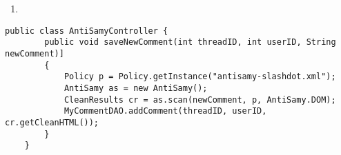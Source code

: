 \begin{enumerate}
\def\labelenumi{(\arabic{enumi})}
\setcounter{enumi}{5}
\tightlist
\item
\end{enumerate}

\begin{verbatim}
public class AntiSamyController {  
        public void saveNewComment(int threadID, int userID, String newComment)]
        {  
            Policy p = Policy.getInstance("antisamy-slashdot.xml");  
            AntiSamy as = new AntiSamy();  
            CleanResults cr = as.scan(newComment, p, AntiSamy.DOM);  
            MyCommentDAO.addComment(threadID, userID, cr.getCleanHTML());  
        }  
    }
\end{verbatim}
